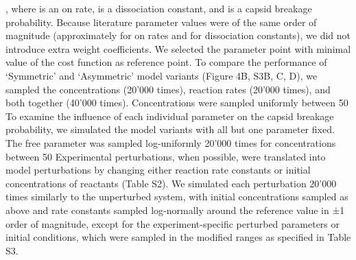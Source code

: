  , 
where   is an on rate,   is a dissociation constant, and   is a capsid breakage probability. Because literature parameter values were of the same order of magnitude (approximately   for on rates and   for dissociation constants), we did not introduce extra weight coefficients. We selected the parameter point with minimal value of the cost function as reference point.
To compare the performance of ‘Symmetric’ and ‘Asymmetric’ model variants (Figure 4B, S3B, C, D), we sampled the concentrations (20’000 times), reaction rates (20’000 times), and both together (40’000 times). Concentrations were sampled uniformly between 50%
To examine the influence of each individual parameter on the capsid breakage probability, we simulated the model variants with all but one parameter fixed. The free parameter was sampled log-uniformly 20’000 times for concentrations between 50%
Experimental perturbations, when possible, were translated into model perturbations by changing either reaction rate constants or initial concentrations of reactants (Table S2). We simulated each perturbation 20’000 times similarly to the unperturbed system, with initial concentrations sampled as above and rate constants sampled log-normally around the reference value in ±1 order of magnitude, except for the experiment-specific perturbed parameters or initial conditions, which were sampled in the modified ranges as specified in Table S3.
